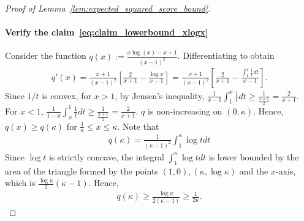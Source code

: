 \documentclass[11pt]{article}
\newcommand{\btau}{\kappa}
\theoremstyle{named}
\theoremstyle{plain}
\newcommand{\defn}{:=}
\newcommand{\brackets}[1]{\left[ #1 \right]}
\begin{document}
\begin{proof}[Proof of Lemma~\ref{lem:expected_squared_score_bound}\label{proof_lem:expected_squared_score_bound}]
  \paragraph{Verify the claim~\eqref{eq:claim_lowerbound_xlogx}} Consider the function $q(x) \defn \frac{x\log(x) - x + 1}{(x-1)^2}$. Differentiating to obtain
  \begin{align*}
    q'(x) = \frac{x+1}{(x-1)^2} \brackets{ \frac{2}{x+1} - \frac{\log x}{x-1}} = \frac{x+1}{(x-1)^2} \brackets{ \frac{2}{x+1} - \frac{\int_1^x \frac{1}{t} dt}{x-1}}.
  \end{align*}
  Since $1/t$ is convex, for $x > 1$, by Jensen's inequality, $\frac{1}{x-1}\int_1^x \frac{1}{t} dt \geq \frac{1}{\frac{x+1}{2}} = \frac{2}{x+1}$. For $x < 1$, $\frac{1}{1-x}\int_x^1 \frac{1}{t} dt \geq \frac{1}{\frac{x+1}{2}} = \frac{2}{x+1}$. $q$ is non-increasing on $(0, \btau)$. Hence, $q(x) \geq q(\btau)$ for $\frac{1}{\btau} \leq x \leq \btau$.
  Note that
  \begin{align*}
    q(\btau) = \frac{1}{(\btau-1)^2} \int_1^{\btau} \log t dt
  \end{align*}
  Since $\log t$ is strictly concave, the integral $\int_1^{\btau} \log t dt$ is lower bounded by the area of the triangle formed by the points $(1, 0), (\btau, \log \btau)$ and the $x$-axis, which is $\frac{\log \btau}{2} (\btau - 1)$. Hence,
  \begin{align*}
    q(\btau) \geq \frac{\log \btau}{2 (\btau - 1)} \geq \frac{1}{2 \btau}.
  \end{align*}
\end{proof}
\end{document}
